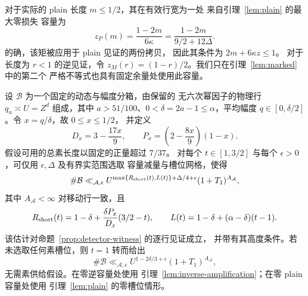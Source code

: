 对于实际的 plain 长度 \(m\le1/2\)，其在有效行宽为一处
来自引理~\ref{lem:plain} 的最大零损失
容量为
\begin{equation}
 z_P(m)=\frac{1-2m}{6\kappa}
       =\frac{1-2m}{9/2+12\Delta}.
 \label{eq:plain-zero-loss-capacity}
\end{equation}
的确，该矩被应用于 plain 见证的两份拷贝，
因此其条件为 \(2m+6\kappa z\le1\)。
对于长度为 \(r<1\) 的逆见证，令
\(z_M(r)=(1-r)/2\)。我们只在引理~\ref{lem:marked} 中的第二个
严格不等式也具有固定余量处使用此容量。

\begin{proposition}[来自见证的行计数]\label{prop:detector-counts}
设 \(\mathcal B\) 为一个固定的动态与幅度分箱，由保留的
无六次幂因子的物理行 \(q_u\asymp U=Z^d\) 组成，其中
\(a>51/100\)、\(0<\delta=2a-1\le\alpha\)，平均幅度
\(q\in[0,\delta/2]\)。令 \(x=q/\delta\)，故 \(0\le x\le1/2\)，
并定义
\[
 D_x=3-\frac{17x}{9},\qquad
 P_x=\left(2-\frac{8x}{9}\right)(1-x).
\]
假设可用的总素长度以固定的正量超过 \(7/37\)。
对每个 \(t\in[1,3/2]\) 与每个
\(\epsilon>0\)，可仅用 \(\epsilon,\Delta\) 及有界实范围选取
容量减量与槽位网格，使得
\[
 \#\mathcal B\ll_{\mathcal A,\epsilon}
 U^{\max\{R_{\rm short}(t),L(t)\}+\Delta/4+\epsilon}
 (1+T_1)^{A_{\mathcal A}},
\]
其中 \(A_{\mathcal A}<\infty\) 对移动行一致，且
\[
 R_{\rm short}(t)=1-\delta+\frac{\delta P_x}{D_x}(3/2-t),
 \qquad
 L(t)=1-\delta+(\alpha-\delta)(t-1).
\]
该估计对命题~\ref{prop:detector-witness} 的逐行见证成立，
并带有其高度条件。若未选取任何素槽位，则 \(t=1\) 转而给出
\[
 \#\mathcal B\ll_{\mathcal A,\epsilon}
 U^{1-2\delta/3+\epsilon}(1+T_1)^{A_{\mathcal A}},
\]
无需素供给假设。在零逆容量处使用
引理~\ref{lem:inverse-amplification}；在零 plain 容量处使用
引理~\ref{lem:plain} 的零槽位情形。
\end{proposition}

